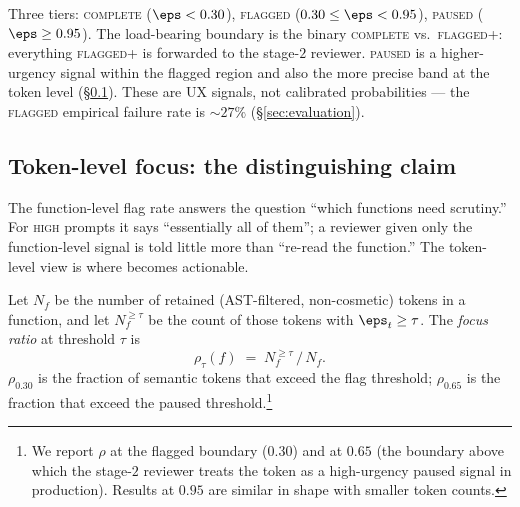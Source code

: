 Three tiers: \textsc{complete} ($\eps < 0.30$), \textsc{flagged}
($0.30 \le \eps < 0.95$), \textsc{paused} ($\eps \ge 0.95$). The
load-bearing boundary is the binary \textsc{complete} vs.\
\textsc{flagged+}: everything \textsc{flagged+} is forwarded to the
stage-$2$ reviewer. \textsc{paused} is a higher-urgency signal
within the flagged region and also the more precise band at the
token level (\S\ref{subsec:token-focus}). These are UX signals, not
calibrated probabilities --- the \textsc{flagged} empirical failure
rate is $\sim 27\%$ (\S\ref{sec:evaluation}).

\subsection{Token-level focus: the distinguishing claim}
\label{subsec:token-focus}

The function-level flag rate answers the question ``which functions
need scrutiny.'' For \textsc{high} prompts it says ``essentially all
of them''; a reviewer given only the function-level signal is told
little more than ``re-read the function.'' The token-level view is
where \eps becomes actionable.

Let $N_f$ be the number of retained (AST-filtered, non-cosmetic)
tokens in a function, and let $N_f^{\ge\tau}$ be the count of those
tokens with $\eps_t \ge \tau$. The \emph{focus ratio} at threshold
$\tau$ is
\begin{equation}
  \rho_\tau(f) \;=\; N_f^{\ge\tau} \,/\, N_f.
  \label{eq:focus}
\end{equation}
$\rho_{0.30}$ is the fraction of semantic tokens that exceed the
flag threshold; $\rho_{0.65}$ is the fraction that exceed the paused
threshold.\footnote{We report $\rho$ at the flagged boundary ($0.30$)
and at $0.65$ (the boundary above which the stage-$2$ reviewer
treats the token as a high-urgency paused signal in production).
Results at $0.95$ are similar in shape with smaller token counts.}

